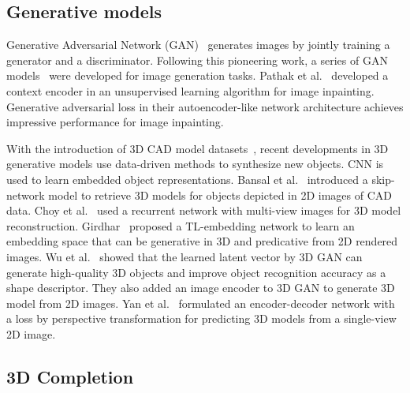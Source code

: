 \documentclass[10pt,twocolumn,letterpaper]{article}
\begin{document}
\subsection{Generative models}
Generative Adversarial Network (GAN)~\cite{gan} generates images by jointly training a generator and a discriminator. Following this pioneering work, a series of GAN models~\cite{dcgan,lapgan} were developed for image generation tasks. Pathak et al.~\cite{contextencoder} developed a context encoder in an unsupervised learning algorithm for image inpainting. Generative adversarial loss in their autoencoder-like network architecture achieves impressive performance for image inpainting.%

With the introduction of 3D CAD model datasets~\cite{modelnet,shapenet}, recent developments in 3D generative models use data-driven methods to synthesize new objects. CNN is used to learn embedded object representations. Bansal et al.~\cite{marr} introduced a skip-network model to retrieve 3D models for objects depicted in 2D images of CAD data. Choy et al.~\cite{r2n2} used a recurrent network with multi-view images for 3D model reconstruction. Girdhar~\cite{tl} proposed a TL-embedding network to learn an embedding space that can be generative in 3D and predicative from 2D rendered images. Wu et al.~\cite{3dgan} showed that the learned latent vector by 3D GAN can generate high-quality 3D objects and improve object recognition accuracy as a shape descriptor. They also added an image encoder to 3D GAN to generate 3D model from 2D images. Yan et al.~\cite{honglak} formulated an encoder-decoder network with a loss by perspective transformation for predicting 3D models from a single-view 2D image.
\subsection{3D Completion}
\end{document}
